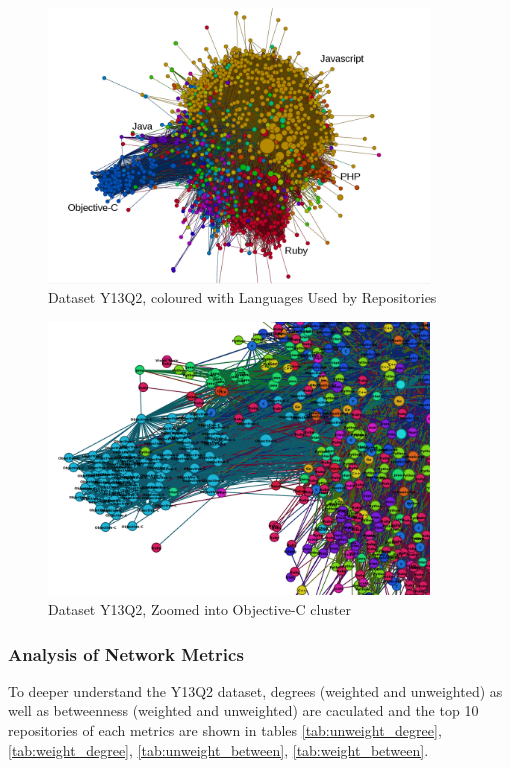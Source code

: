 \documentclass[11pt]{article}
\begin{document}
\begin{figure}[htp!]
  \begin{center}
    \includegraphics[width=0.9\textwidth]{Y13Q2_lang.png}
  \end{center}
  \caption{Dataset Y13Q2, coloured with Languages Used by Repositories}
  \label{fig:static_lang}
\end{figure}

\begin{figure}[htp!]
  \begin{center}
    \includegraphics[width=0.9\textwidth]{Y13Q2_zoom.png}
  \end{center}
  \caption{Dataset Y13Q2, Zoomed into Objective-C cluster}
  \label{fig:zoom_2013}
\end{figure}



\subsubsection{Analysis of Network Metrics}
To deeper understand the Y13Q2 dataset, degrees (weighted and unweighted) as well as betweenness (weighted and unweighted) are caculated and the top 10 repositories of each metrics are shown in tables \ref{tab:unweight_degree}, \ref{tab:weight_degree}, \ref{tab:unweight_between}, \ref{tab:weight_between}.
\end{document}
